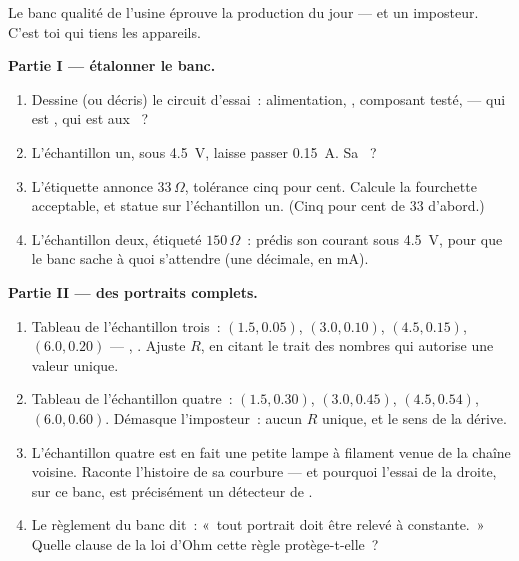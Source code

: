 \begin{problem}\label{pb:g8:ohms-law:1}
Le banc qualité de l'usine éprouve la production du jour --- et un
imposteur. C'est toi qui tiens les appareils.

\medskip\noindent\textbf{Partie I --- étalonner le banc.}
\begin{enumerate}
  \item Dessine (ou décris) le circuit d'essai~: alimentation,
        , composant testé,  --- qui est , qui est aux ~?
  \item L'échantillon un, sous \qty{4.5}{V}, laisse passer
        \qty{0.15}{A}. Sa ~?
  \item L'étiquette annonce $33\,\Omega$, tolérance cinq pour cent.
        Calcule la fourchette acceptable, et statue sur
        l'échantillon un. (Cinq pour cent de $33$ d'abord.)
  \item L'échantillon deux, étiqueté $150\,\Omega$~: prédis son
        courant sous \qty{4.5}{V}, pour que le banc sache à quoi
        s'attendre (une décimale, en \unit{mA}).
\end{enumerate}

\medskip\noindent\textbf{Partie II --- des portraits complets.}
\begin{enumerate}[resume]
  \item Tableau de l'échantillon trois~: $(1.5, 0.05)$,
        $(3.0, 0.10)$, $(4.5, 0.15)$, $(6.0, 0.20)$ --- ,
        . Ajuste $R$, en citant le trait des nombres qui
        autorise une valeur unique.
  \item Tableau de l'échantillon quatre~: $(1.5, 0.30)$,
        $(3.0, 0.45)$, $(4.5, 0.54)$, $(6.0, 0.60)$. Démasque
        l'imposteur~: aucun $R$ unique, et le sens de la dérive.
  \item L'échantillon quatre est en fait une petite lampe à
        filament venue de la chaîne voisine. Raconte l'histoire de
        sa courbure --- et pourquoi l'essai de la droite, sur ce
        banc, est précisément un détecteur de .
  \item Le règlement du banc dit~: «~tout portrait doit être relevé
        à  constante.~» Quelle clause de la loi d'Ohm
        cette règle protège-t-elle~?
\end{enumerate}


\end{problem}
